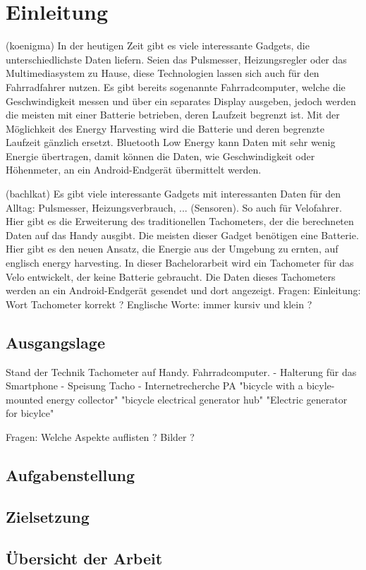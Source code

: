 \chapter{Einleitung}
(koenigma)
In der heutigen Zeit gibt es viele interessante Gadgets, die unterschiedlichste Daten liefern. Seien das Pulsmesser, Heizungsregler oder das Multimediasystem zu Hause, diese Technologien lassen sich auch für den Fahrradfahrer nutzen. Es gibt bereits sogenannte Fahrradcomputer, welche die Geschwindigkeit messen und über ein separates Display ausgeben, jedoch werden die meisten mit einer Batterie betrieben, deren Laufzeit begrenzt ist. Mit der Möglichkeit des Energy Harvesting wird die Batterie und deren begrenzte Laufzeit gänzlich ersetzt. Bluetooth Low Energy kann Daten mit sehr wenig Energie übertragen, damit können die Daten, wie Geschwindigkeit oder Höhenmeter, an ein Android-Endgerät übermittelt werden.

(bachlkat)
Es gibt viele interessante Gadgets mit interessanten Daten für den Alltag: Pulsmesser, Heizungsverbrauch, ... (Sensoren). So auch für Velofahrer. Hier gibt es die Erweiterung des traditionellen Tachometers, der die berechneten Daten auf das Handy ausgibt. 
Die meisten dieser Gadget benötigen eine Batterie. Hier gibt es den neuen Ansatz, die Energie aus der Umgebung zu ernten, auf englisch energy harvesting. In dieser Bachelorarbeit wird ein Tachometer für das Velo entwickelt, der keine Batterie gebraucht. Die Daten dieses Tachometers werden an ein Android-Endgerät gesendet und dort angezeigt.
Fragen: 
Einleitung: Wort Tachometer korrekt ?
Englische Worte: immer kursiv und klein ?

\section{Ausgangslage}
Stand der Technik
Tachometer auf Handy.
Fahrradcomputer.
- Halterung für das Smartphone
- Speisung Tacho
- Internetrecherche PA \cite{PA_bicycle} 
   "bicycle with a bicyle-mounted energy collector"
   "bicycle electrical generator hub"
   "Electric generator for bicylce"

Fragen:
Welche Aspekte auflisten ?  
Bilder ?

\section{Aufgabenstellung}



\section{Zielsetzung}





\section{Übersicht der Arbeit}
